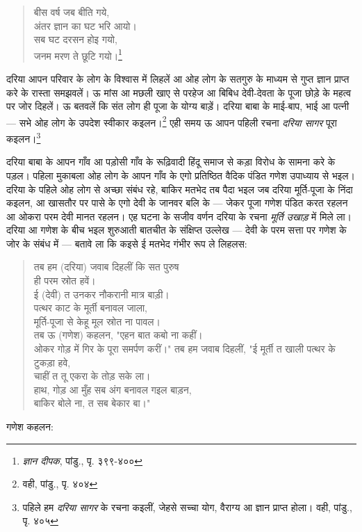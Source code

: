 \begin{quote}
बीस वर्ष जब बीति गये,\\
अंतर ज्ञान का घट भरि आयो।\\
सब घट दरसन होइ गयो,\\
जनम मरण ते छूटि गयो।\footnote{\textit{ज्ञान दीपक}, पांडु., पृ. ३९९-४००}
\end{quote}

दरिया आपन परिवार के लोग के विश्वास में लिहलें आ ओह लोग के सतगुरु के माध्यम से गुप्त ज्ञान प्राप्त करे के रास्ता समझवलें। ऊ मांस आ मछली खाए से परहेज आ बिबिध देवी-देवता के पूजा छोड़े के महत्व पर जोर दिहलें। ऊ बतवलें कि संत लोग ही पूजा के योग्य बाड़ें। दरिया बाबा के माई-बाप, भाई आ पत्नी — सभे ओह लोग के उपदेश स्वीकार कइलन।\footnote{वही, पांडु., पृ. ४०४} एही समय ऊ आपन पहिली रचना \textit{दरिया सागर} पूरा कइलन।\footnote{पहिले हम \textit{दरिया सागर} के रचना कइलीं, जेहसे सच्चा योग, वैराग्य आ ज्ञान प्राप्त होला। वही, पांडु., पृ. ४०५}

दरिया बाबा के आपन गाँव आ पड़ोसी गाँव के रूढ़िवादी हिंदू समाज से कड़ा विरोध के सामना करे के पड़ल। पहिला मुकाबला ओह लोग के आपन गाँव के एगो प्रतिष्ठित वैदिक पंडित गणेश उपाध्याय से भइल। दरिया के पहिले ओह लोग से अच्छा संबंध रहे, बाकिर मतभेद तब पैदा भइल जब दरिया मूर्ति-पूजा के निंदा कइलन, आ खासतौर पर पासे के एगो देवी के जानवर बलि के — जेकर पूजा गणेश पंडित करत रहलन आ ओकरा परम देवी मानत रहलन। एह घटना के सजीव वर्णन दरिया के रचना \textit{मूर्ति उखाड़} में मिले ला। दरिया आ गणेश के बीच भइल शुरुआती बातचीत के संक्षिप्त उल्लेख — देवी के परम सत्ता पर गणेश के जोर के संबंध में — बतावे ला कि कइसे ई मतभेद गंभीर रूप ले लिहलस:

\begin{quote}
तब हम (दरिया) जवाब दिहलीं कि सत पुरुष \\
ही परम स्रोत हवें। \\
ई (देवी) त उनकर नौकरानी मात्र बाड़ी। \\
पत्थर काट के मूर्ती बनावल जाला, \\
मूर्ति-पूजा से केहू मूल स्रोत ना पावल। \\
तब ऊ (गणेश) कहलन, "एहन बात कबो ना कहीं। \\
ओकर गोड़ में गिर के पूरा समर्पण करीं।"
तब हम जवाब दिहलीं, "ई मूर्ती त खाली पत्थर के टुकड़ा हवे, \\
चाहीं त तू एकरा के तोड़ सके ला। \\
हाथ, गोड़ आ मुँह सब अंग बनावल गइल बाड़न, \\
बाकिर बोले ना, त सब बेकार बा।"
\end{quote}

गणेश कहलन:

